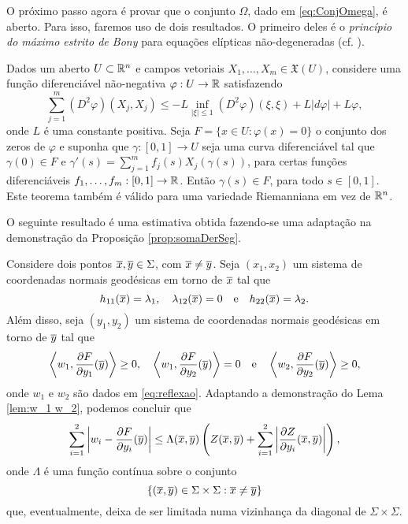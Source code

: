 O pr\'oximo passo agora \'e provar que o conjunto $\Omega$,
dado em \eqref{eq:ConjOmega}, \'e aberto. Para isso, faremos
uso de dois resultados. O primeiro deles \'e o {\em princ\'ipio
do m\'aximo estrito de Bony} para equa\c c\~oes el\'ipticas 
n\~ao-degeneradas (cf. \cite[Corollary 9.7]{Brendle2010}).

\begin{teorema} \label{teo:bony}
Dados um aberto $U\subset\mathbb{R}^n$ e campos vetoriais 
$X_1,\ldots,X_m\in\mathfrak{X}(U)$, considere uma fun\c c\~ao
diferenci\'avel n\~ao-negativa $\varphi:U\to\mathbb{R}$ satisfazendo
\begin{equation}\label{eq:bony}
\sum_{j=1}^{m} (D^2 \varphi)(X_j,X_j) \leq -L \inf_{|\xi| \leq 1} 
(D^2 \varphi)(\xi,\xi) + L |d \varphi| + L \varphi,
\end{equation}
onde $L$ é uma constante positiva. Seja $F=\{x\in U:\varphi(x)=0\}$
o conjunto dos zeros de $\varphi$ e suponha que $\gamma:[0,1]\to U$
seja uma curva diferenciável tal que $\gamma(0)\in F$ e 
$\gamma'(s) = \displaystyle\sum_{j=1}^{m} f_j(s) X_j(\gamma(s))$, para certas
funções diferenciáveis $f_1,\ldots,f_m:[0,1]\to\mathbb{R}$. Então 
$\gamma(s)\in F$, para todo $s\in[0,1]$.
Este teorema também é válido para uma variedade Riemanniana em vez de $\mathbb{R}^n$.
\end{teorema}

O seguinte resultado \'e uma estimativa obtida fazendo-se uma
adapta\c c\~ao na demonstra\c c\~ao da Proposi\c c\~ao
\ref{prop:somaDerSeg}.

Considere dois pontos $\overline{x},\overline{y}\in\Sigma$, com $\overline{x}\neq\overline{y}$. Seja
$(x_1,x_2)$ um sistema de coordenadas normais geod\'esicas em
torno de $\overline{x}$ tal que
\[
h_{11}(\overline{x})=\lambda_1, \quad \lambda_{12}(\overline{x})=0
\quad\mbox{e}\quad h_{22}(\overline{x})=\lambda_2. 
\]
Al\'em disso, seja $(y_1,y_2)$ um sistema de coordenadas normais 
geod\'esicas em torno de $\overline{y}$ tal que
\begin{equation*}
\left\langle w_1, \frac{\partial F}{\partial y_1}(\overline{y}) \right\rangle \geq 0, 
\quad 
\left\langle w_1, \frac{\partial F}{\partial y_2}(\overline{y}) \right\rangle = 0 
\quad \text{e} \quad 
\left\langle w_2, \frac{\partial F}{\partial y_2}(\overline{y}) \right\rangle \geq 0,
\end{equation*}
onde $w_1$ e $w_2$ s\~ao dados em \eqref{eq:reflexao}. Adaptando
a demonstra\c c\~ao do Lema \ref{lem:w_1 w_2}, podemos concluir
que
\[
\sum_{i=1}^2\left| w_i-\frac{\partial F}{\partial y_i}(\overline{y})\right| \leq
\Lambda(\overline{x},\overline{y})\left(Z(\overline{x},\overline{y})+\sum_{i=1}^2
\left|\frac{\partial Z}{\partial y_i}(\overline{x},\overline{y})\right|\right),
\]
onde $\Lambda$ \'e uma fun\c c\~ao cont\'inua sobre o conjunto
\[
\{(\overline{x},\overline{y})\in\Sigma\times\Sigma:\overline{x}\neq\overline{y}\}
\]
que, eventualmente, deixa de ser limitada numa vizinhan\c ca
da diagonal de $\Sigma\times\Sigma$. 

